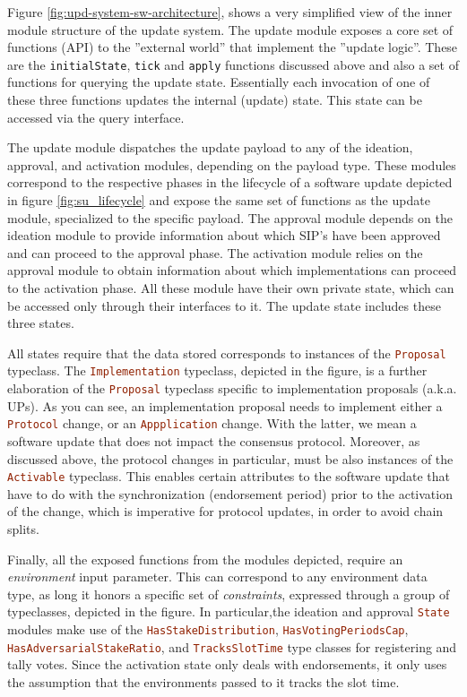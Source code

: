Figure \ref{fig:upd-system-sw-architecture}, shows a very simplified view of 
the 
inner module structure of the update
system. The update module exposes a core set of functions (API) to the 
''external world'' that implement the ''update logic''. These are the 
\lstinline[language=Haskell]!initialState!, 
\lstinline[language=Haskell]!tick! and \lstinline[language=Haskell]!apply! 
functions discussed above and also a 
set of functions for querying the update state. Essentially each invocation of 
one of these three functions updates the internal (update) state. This state 
can be accessed via the query interface.

The update module dispatches the update payload to any of the 
ideation,
approval, and activation modules, depending on the payload type. These modules 
correspond to the respective phases in the lifecycle of a software update 
depicted in figure \ref{fig:su_lifecycle} and expose the same set of functions 
as the update module, specialized to the specific payload. 
The approval
module depends on the ideation module to provide information about which SIP's
have been approved and can proceed to the approval phase. The activation module
relies on the approval module to obtain information about which implementations
can proceed to the activation phase. All these module have their own private
state, which can be accessed only through their interfaces to it. The update
state includes these three states.

All states require that the data stored corresponds to instances of the
\lstinline[language=Haskell]!Proposal! typeclass. The 
\lstinline[language=Haskell]!Implementation! typeclass, depicted in the figure, 
is a further elaboration of the \lstinline[language=Haskell]!Proposal! 
typeclass specific to implementation proposals (a.k.a. UPs). As you can see, an 
implementation proposal needs to implement either a 
\lstinline[language=Haskell]!Protocol! change, or an 
\lstinline[language=Haskell]!Appplication! change. With the latter, we mean a 
software update that does not impact the consensus protocol. Moreover, as 
discussed above,
the protocol changes in particular, must be also instances of the 
\lstinline[language=Haskell]!Activable! typeclass. 
This enables certain attributes to the software update that have to do with the 
synchronization (endorsement period) prior to the activation of the change, 
which is imperative for protocol updates, in order to avoid chain splits.

Finally, all the exposed functions from the modules depicted, require an 
\emph{environment} input parameter. This can correspond to any environment data 
type, as long it honors a specific set of \emph{constraints}, expressed through 
a group of typeclasses, depicted in the figure. In particular,the ideation and 
approval 
\lstinline[language=Haskell]!State! modules
make use of the \lstinline[language=Haskell]!HasStakeDistribution!,
\lstinline[language=Haskell]!HasVotingPeriodsCap!, 
\lstinline[language=Haskell]!HasAdversarialStakeRatio!, and
\lstinline[language=Haskell]!TracksSlotTime! type classes for registering and 
tally votes. Since
the activation state only deals with endorsements, it only uses the assumption
that the environments passed to it tracks the slot time.
